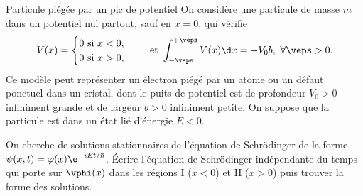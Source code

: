 \begin{exo}[PC][2][TD]{Particule piégée par un pic de potentiel}
  On considère une particule de masse $m$ dans un potentiel nul partout, sauf en $x=0$, qui vérifie
  \begin{equation*}
    V(x) =
    \begin{cases}
    0 \mbox{ si } x<0, \\
    0 \mbox{ si } x> 0,
    \end{cases} \quad \text{ et } \int_{-\veps}^{+\veps} V(x) \d x = -V_0 b,~\forall \veps > 0.
    \end{equation*}
  Ce modèle peut représenter un électron piégé par un atome ou un défaut ponctuel dans un cristal, dont le puits de potentiel est de profondeur $V_0>0$ infiniment grande et de largeur $b>0$ infiniment petite. On suppose que la particule est dans un état lié d'énergie $E<0$.
  \begin{quest}
    \item	On cherche de solutions stationnaires de l'équation de Schrödinger de la forme $\psi(x,t) = \varphi(x) \e^{-iEt/\hbar}$. Écrire l'équation de Schrödinger indépendante du temps qui porte sur $\vphi(x)$ dans les régions I ($x<0$) et II ($x>0$) puis trouver la forme des solutions.
    

\end{quest}
\end{exo}
